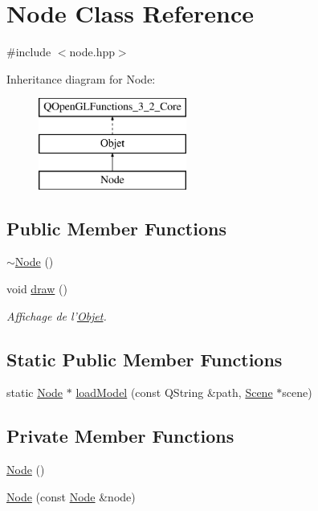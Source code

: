 \hypertarget{class_node}{\section{Node Class Reference}
\label{class_node}
}


{\ttfamily \#include $<$node.\+hpp$>$}

Inheritance diagram for Node\+:\begin{figure}[H]
\begin{center}
\leavevmode
\includegraphics[height=3.000000cm]{class_node}
\end{center}
\end{figure}
\subsection*{Public Member Functions}
\begin{DoxyCompactItemize}
\item 
\hyperlink{class_node_aa0840c3cb5c7159be6d992adecd2097c}{$\sim$\+Node} ()
\item 
void \hyperlink{class_node_ab88c83ced58700a56de568f5b1e3c473}{draw} ()
\begin{DoxyCompactList}\small\item\em Affichage de l'\hyperlink{class_objet}{Objet}. \end{DoxyCompactList}\end{DoxyCompactItemize}
\subsection*{Static Public Member Functions}
\begin{DoxyCompactItemize}
\item 
static \hyperlink{class_node}{Node} $\ast$ \hyperlink{class_node_ac2140ddf8f06f8b5620e6743c945c482}{load\+Model} (const Q\+String \&path, \hyperlink{class_scene}{Scene} $\ast$scene)
\end{DoxyCompactItemize}
\subsection*{Private Member Functions}
\begin{DoxyCompactItemize}
\item 
\hyperlink{class_node_ad7a34779cad45d997bfd6d3d8043c75f}{Node} ()
\item 
\hyperlink{class_node_a4bf5930c1238505203c3dcf6e4573bad}{Node} (const \hyperlink{class_node}{Node} \&node)
\end{DoxyCompactItemize}
